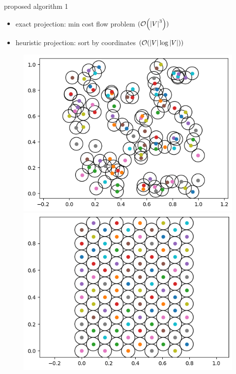 \documentclass[13pt,aspectratio=169,table,dvipdfmx]{beamer}
\begin{document}
\begin{frame}{proposed algorithm 1}
    \begin{itemize}
        \item exact projection: min cost flow problem $(\order{\abs{V}^3})$
        \item heuristic projection: sort by coordinates $(\order{\abs{V} \log \abs{V}})$
    \end{itemize}
    \begin{figure}[htbp]
        \begin{minipage}{0.45\hsize}
            \centering
            \includegraphics[width=\columnwidth]{imgs/hex1.png}
        \end{minipage}
        \begin{minipage}{0.45\hsize}
            \centering
            \includegraphics[width=\columnwidth]{imgs/hex2.png}
        \end{minipage}
    \end{figure}
\end{frame}
\end{document}
